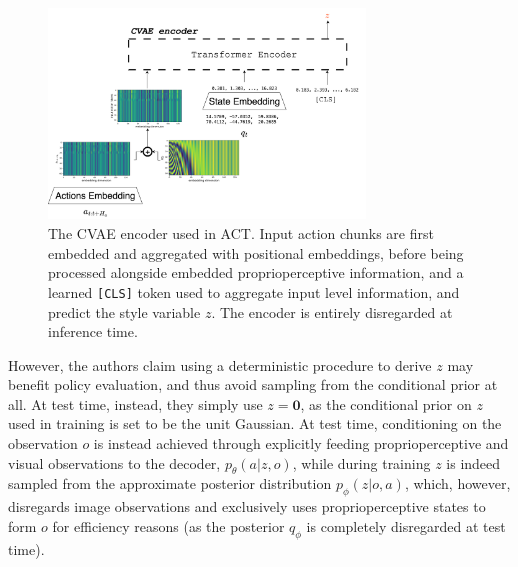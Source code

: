 \begin{figure}
    \centering
    \includegraphics[width=0.75\textwidth]{figures/ch4/ch4-act-encoder.png}
    \caption{The CVAE encoder used in ACT. Input action chunks are first embedded and aggregated with positional embeddings, before being processed alongside embedded proprioperceptive information, and a learned \texttt{[CLS]} token used to aggregate input level information, and predict the style variable \( z \). The encoder is entirely disregarded at inference time.}
    \label{fig:ch4-act-encoder}
\end{figure}

However, the authors claim using a deterministic procedure to derive \( z \) may benefit policy evaluation, and thus avoid sampling from the conditional prior at all.
At test time, instead, they simply use \( z = \mathbf{0} \), as the conditional prior on \( z \) used in training is set to be the unit Gaussian.
At test time, conditioning on the observation \( o \) is instead achieved through explicitly feeding proprioperceptive and visual observations to the decoder, \( p_\theta(a \vert z, o) \), while during training \( z \) is indeed sampled from the approximate posterior distribution \(p_\phi(z \vert o, a)\), which, however, disregards image observations and exclusively uses proprioperceptive states to form \( o \) for efficiency reasons (as the posterior \(q_\phi \) is completely disregarded at test time).

